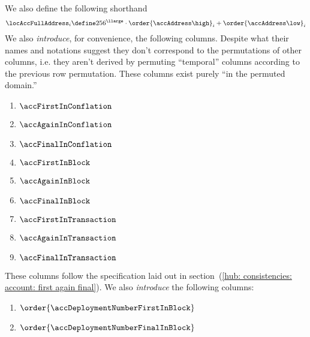 We also define the following shorthand
\[
	\locAccFullAddress_{i}
	\define
	256^\llarge \cdot \order{\accAddress\high}_{i} + \order{\accAddress\low}_{i}
\]
We also \emph{introduce}, for convenience, the following columns.
Despite what their names and notations suggest they don't correspond to the permutations of other columns,
i.e. they aren't derived by permuting ``temporal'' columns according to the previous row permutation.
These columns exist purely ``in the permuted domain.''
\begin{multicols}{3}
	\begin{enumerate}
		\item $\accFirstInConflation$
		\item $\accAgainInConflation$
		\item $\accFinalInConflation$
		\item $\accFirstInBlock$
		\item $\accAgainInBlock$
		\item $\accFinalInBlock$
		\item $\accFirstInTransaction$
		\item $\accAgainInTransaction$
		\item $\accFinalInTransaction$
	\end{enumerate}
\end{multicols}
\noindent These columns follow the specification laid out in section~(\ref{hub: consistencies: account: first again final}).
We also \emph{introduce} the following columns:
\begin{multicols}{2}
	\begin{enumerate}
		\item $\order{\accDeploymentNumberFirstInBlock}$
		\item $\order{\accDeploymentNumberFinalInBlock}$
	\end{enumerate}
\end{multicols}
